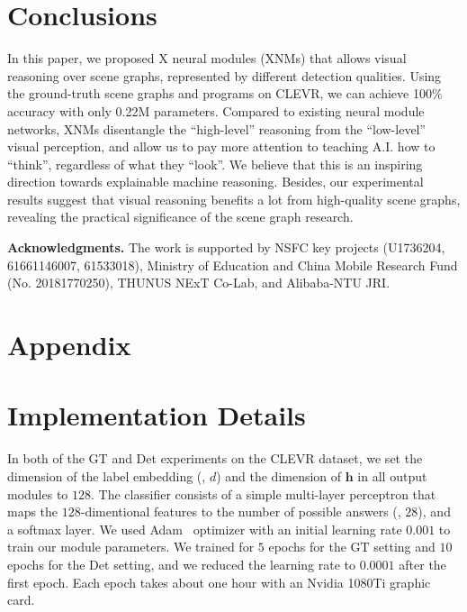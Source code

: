 \documentclass[10pt,twocolumn,letterpaper]{article}
\begin{document}
\section{Conclusions}
In this paper, we proposed X neural modules (XNMs) that allows visual reasoning over scene graphs, represented by different detection qualities.
Using the ground-truth scene graphs and programs on CLEVR, we can achieve 100\% accuracy with only 0.22M parameters. Compared to existing neural module networks, XNMs disentangle the ``high-level'' reasoning from the ``low-level'' visual perception, and allow us to pay more attention to teaching A.I. how to ``think'', regardless of what they ``look''. We believe that this is an inspiring direction towards explainable machine reasoning. Besides, our experimental results suggest that visual reasoning benefits a lot from high-quality scene graphs, revealing the practical significance of the scene graph research.


\textbf{Acknowledgments.}
The work is supported by NSFC key projects (U1736204, 61661146007, 61533018), Ministry of Education and China Mobile Research Fund (No. 20181770250), THUNUS NExT Co-Lab, and Alibaba-NTU JRI.






{\small


}






\newpage
\appendix
\section*{Appendix}
\section{Implementation Details}
In both of the GT and Det experiments on the CLEVR dataset, we set the dimension of the label embedding (\ie, $d$) and the dimension of $\mathbf{h}$ in all output modules to $128$. The classifier consists of a simple multi-layer perceptron that maps the $128$-dimentional features to the number of possible answers (\ie, $28$), and a softmax layer.
We used Adam~\cite{kingma2014adam} optimizer with an initial learning rate $0.001$ to train our module parameters. We trained for $5$ epochs for the GT setting and $10$ epochs for the Det setting, and we reduced the learning rate to $0.0001$ after the first epoch. Each epoch takes about one hour with an Nvidia 1080Ti graphic card.
\end{document}
